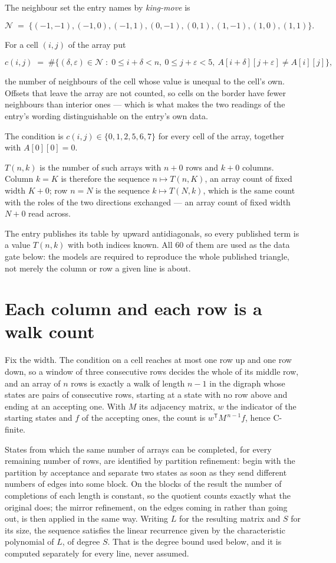 \documentclass[11pt]{article}
\theoremstyle{definition}
\begin{document}
The neighbour set the entry names by {\itshape king-move} is

\[\mathcal{N} \;=\; \{(-1,-1), (-1,0), (-1,1), (0,-1), (0,1), (1,-1), (1,0), (1,1)\}.\]

For a cell $(i,j)$ of the array put

\[c(i,j) \;=\; \#\bigl\{(\delta,\varepsilon)\in\mathcal{N} \;:\; 0\le i+\delta<n,\ 0\le j+\varepsilon<5,\ A[i+\delta][j+\varepsilon] \neq A[i][j]\bigr\},\]

the number of neighbours of the cell whose value is unequal to the cell's own. Offsets that leave the array are not counted, so cells on the border have fewer neighbours than interior ones --- which is what makes the two readings of the entry's wording distinguishable on the entry's own data.

The condition is $c(i,j) \in \{0, 1, 2, 5, 6, 7\}$ for every cell of the array, together with $A[0][0]=0$.

$T(n,k)$ is the number of such arrays with $n + 0$ rows and $k + 0$ columns. Column $k = K$ is therefore the sequence $n \mapsto T(n,K)$, an array count of fixed width $K + 0$; row $n = N$ is the sequence $k \mapsto T(N,k)$, which is the same count with the roles of the two directions exchanged --- an array count of fixed width $N + 0$ read across.

The entry publishes its table by upward antidiagonals, so every published term is a value $T(n,k)$ with both indices known. All 60 of them are used as the data gate below: the models are required to reproduce the whole published triangle, not merely the column or row a given line is about.

\section{Each column and each row is a walk count}

Fix the width. The condition on a cell reaches at most one row up and one row down, so a window of three consecutive rows decides the whole of its middle row, and an array of $n$ rows is exactly a walk of length $n-1$ in the digraph whose states are pairs of consecutive rows, starting at a state with no row above and ending at an accepting one. With $M$ its adjacency matrix, $w$ the indicator of the starting states and $f$ of the accepting ones, the count is $w^{\mathsf T}M^{\,n-1}f$, hence C-finite.

States from which the same number of arrays can be completed, for every remaining number of rows, are identified by partition refinement: begin with the partition by acceptance and separate two states as soon as they send different numbers of edges into some block. On the blocks of the result the number of completions of each length is constant, so the quotient counts exactly what the original does; the mirror refinement, on the edges coming in rather than going out, is then applied in the same way. Writing $L$ for the resulting matrix and $S$ for its size, the sequence satisfies the linear recurrence given by the characteristic polynomial of $L$, of degree $S$. That is the degree bound used below, and it is computed separately for every line, never assumed.
\end{document}

